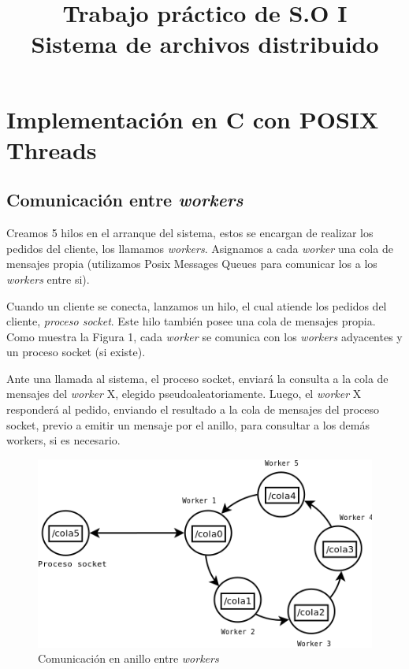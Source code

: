\documentclass[a4paper, 8pt]{article}
\title{Trabajo práctico de S.O I \\ Sistema de archivos distribuido}
\begin{document}
\maketitle

\section{Implementación en C con POSIX Threads}

\subsection{Comunicación entre \textit{workers}}

Creamos 5 hilos en el arranque del sistema, estos se encargan de realizar los pedidos del cliente, los llamamos \textit{workers}.
Asignamos a cada \textit{worker} una cola de mensajes propia (utilizamos Posix Messages Queues para comunicar los a los \textit{workers} entre si).

Cuando un cliente se conecta, lanzamos un hilo, el cual atiende los pedidos del cliente, \textit{proceso socket}.
Este hilo también posee una cola de mensajes propia.
Como muestra la Figura 1, cada \textit{worker} se comunica con los \textit{workers} adyacentes y un proceso socket (si existe).


Ante una llamada al sistema, el proceso socket, enviará la consulta a la cola de mensajes del \textit{worker} X, elegido pseudoaleatoriamente.
Luego, el \textit{worker} X responderá al pedido, enviando el resultado a la cola de mensajes del proceso socket,
previo a emitir un mensaje por el anillo, para consultar a los demás workers, si es necesario.


 \begin{figure}[htbp]
   \centering
     \includegraphics[scale=0.75]{dia1.png}
     \caption{Comunicación en anillo entre \textit{workers}}
   \label{Figura 1}
 \end{figure}
\end{document}
